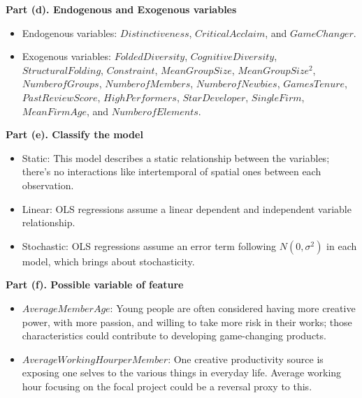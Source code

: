 \documentclass[letterpaper,10pt]{article}
\theoremstyle{definition}
\begin{document}
\noindent\textbf{Part (d). Endogenous and Exogenous variables}
\begin{itemize}
\item Endogenous variables: $Distinctiveness$, $Critical Acclaim$, and $Game Changer$.
\item Exogenous variables: $Folded Diversity$, $Cognitive Diversity$, $Structural Folding$, $Constraint$, $Mean Group Size$, $Mean Group Size^{2}$, $Number of Groups$, $Number of Members$, $Number of Newbies$, $Games Tenure$, $Past Review Score$, $High Performers$, $Star Developer$, $Single Firm$, $Mean Firm Age$, and $Number of Elements$.
\end{itemize}

\noindent\textbf{Part (e). Classify the model}
\begin{itemize}
\item Static: This model describes a static relationship between the variables; there’s no interactions like intertemporal of spatial ones between each observation.
\item Linear: OLS regressions assume a linear dependent and independent variable relationship.
\item Stochastic: OLS regressions assume an error term following $N(0 , \sigma^{2})$ in each model, which brings about stochasticity.
\end{itemize}

\noindent\textbf{Part (f). Possible variable of feature}
\begin{itemize}
\item $Average Member Age$: Young people are often considered having more creative power, with more passion, and willing to take more risk in their works; those characteristics could contribute to developing game-changing products.
\item $Average Working Hour per Member$: One creative productivity source is exposing one selves to the various things in everyday life. Average working hour focusing on the focal project could be a reversal proxy to this.
\end{itemize}
\end{document}
